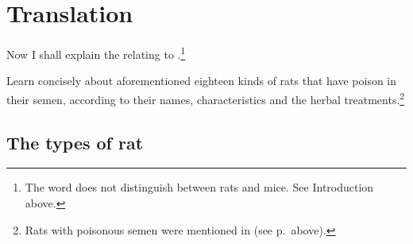 \section{Translation}

\begin{translation}
    
    \item[1] 
    
Now I shall explain the  relating to 
.\footnote{The word  does not distinguish 
between rats and mice.  See Introduction above.}
    
    \item[3] 
    
    Learn concisely about aforementioned eighteen kinds of rats that have 
    poison in their semen, according to their names, characteristics and the 
    herbal treatments.\footnote{Rats with poisonous semen were mentioned 
    in  (see p.\,\pageref{sukravisa} above).}
    
\subsection{The types of rat}

    \item[4--6]
    

\end{translation}

